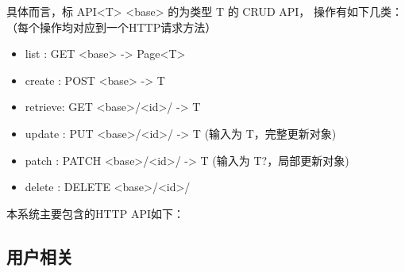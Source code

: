 具体而言，标 API<T> <base> 的为类型 T 的 CRUD API， 操作有如下几类：（每个操作均对应到一个HTTP请求方法）
\begin{itemize}
    \item list : GET <base> -> Page<T>
    \item create : POST <base> -> T
    \item retrieve: GET <base>/<id>/ -> T
    \item update : PUT <base>/<id>/ -> T (输入为 T，完整更新对象)
    \item patch : PATCH <base>/<id>/ -> T (输入为 T?，局部更新对象)
    \item delete : DELETE <base>/<id>/
\end{itemize}

本系统主要包含的HTTP API如下：
\subsection{用户相关}
